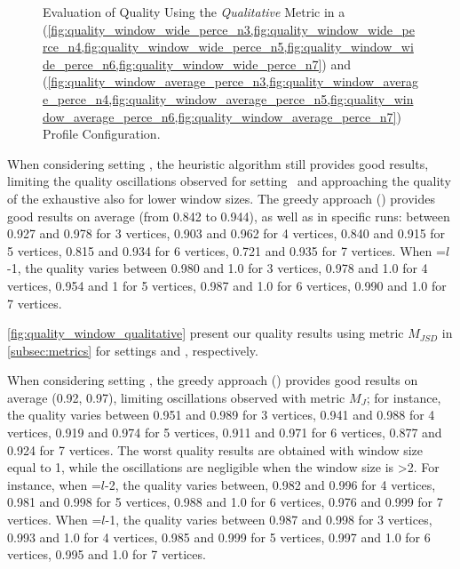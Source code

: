 \begin{figure}[H]
\begin{adjustbox}{minipage=\linewidth,scale=0.75}
    \caption{Evaluation of Quality Using the \emph{Qualitative} Metric in a \wide (\cref{fig:quality_window_wide_perce_n3,fig:quality_window_wide_perce_n4,fig:quality_window_wide_perce_n5,fig:quality_window_wide_perce_n6,fig:quality_window_wide_perce_n7}) and \average (\cref{fig:quality_window_average_perce_n3,fig:quality_window_average_perce_n4,fig:quality_window_average_perce_n5,fig:quality_window_average_perce_n6,fig:quality_window_average_perce_n7}) Profile Configuration.}  \label{fig:quality_window_perce}
  \end{adjustbox}
  \end{figure}

  When considering setting \average, the heuristic algorithm still provides good results, limiting the quality oscillations observed for setting \wide\ and approaching the quality of the exhaustive also for lower window sizes. The greedy approach () provides good results on average (from 0.842 to 0.944), as well as in specific runs: between 0.927 and 0.978 for 3 vertices, 0.903 and 0.962 for 4 vertices, 0.840 and 0.915 for 5 vertices, 0.815 and 0.934 for 6 vertices, 0.721 and 0.935 for 7 vertices.
  When \windowsize=$l$-1, the quality varies between 0.980 and 1.0 for 3 vertices, 0.978 and 1.0 for 4 vertices, 0.954 and 1 for 5 vertices, 0.987 and 1.0 for 6 vertices, 0.990 and 1.0 for 7 vertices.

  \cref{fig:quality_window_qualitative} present our quality results using metric $M_{JSD}$ in \cref{subsec:metrics} for settings \wide and \average, respectively.

  When considering setting \wide, the greedy approach () provides good results on average (0.92, 0.97), limiting oscillations observed with metric $M_J$; for instance, the quality varies between 0.951 and 0.989 for 3 vertices, 0.941 and 0.988 for 4 vertices, 0.919 and 0.974 for 5 vertices, 0.911 and 0.971 for 6 vertices, 0.877 and 0.924 for 7 vertices. 
  The worst quality results are obtained with window size equal to 1, while the oscillations are negligible when the window size is >2. For instance, when \windowsize=$l$-2, the quality varies between, 0.982 and 0.996 for 4 vertices, 0.981 and 0.998 for 5 vertices, 0.988 and 1.0 for 6 vertices, 0.976 and 0.999 for 7 vertices. When \windowsize=$l$-1, the quality varies between  0.987 and  0.998 for 3 vertices, 0.993 and 1.0 for 4 vertices, 0.985 and 0.999 for 5 vertices, 0.997 and 1.0 for 6 vertices, 0.995 and 1.0  for 7 vertices.

